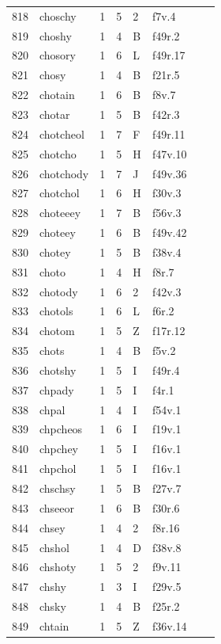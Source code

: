 \documentclass[11pt,a4paper]{article}
\begin{document}
\begin{landscape}
\begin{longtable}{@{}r>{\ttfamily}lrrl>{\ttfamily}l>{\raggedright\arraybackslash}p{80mm}>{\raggedright\arraybackslash}p{36mm}@{}}
818 & choschy & 1 & 5 & 2 & f7v.4 &  & \\
819 & choshy & 1 & 4 & B & f49r.2 &  & \\
820 & chosory & 1 & 6 & L & f49r.17 &  & \\
821 & chosy & 1 & 4 & B & f21r.5 &  & \\
822 & chotain & 1 & 6 & B & f8v.7 &  & \\
823 & chotar & 1 & 5 & B & f42r.3 &  & \\
824 & chotcheol & 1 & 7 & F & f49r.11 &  & \\
825 & chotcho & 1 & 5 & H & f47v.10 &  & \\
826 & chotchody & 1 & 7 & J & f49v.36 &  & \\
827 & chotchol & 1 & 6 & H & f30v.3 &  & \\
828 & choteeey & 1 & 7 & B & f56v.3 &  & \\
829 & choteey & 1 & 6 & B & f49v.42 &  & \\
830 & chotey & 1 & 5 & B & f38v.4 &  & \\
831 & choto & 1 & 4 & H & f8r.7 &  & \\
832 & chotody & 1 & 6 & 2 & f42v.3 &  & \\
833 & chotols & 1 & 6 & L & f6r.2 &  & \\
834 & chotom & 1 & 5 & Z & f17r.12 &  & \\
835 & chots & 1 & 4 & B & f5v.2 &  & \\
836 & chotshy & 1 & 5 & I & f49r.4 &  & \\
837 & chpady & 1 & 5 & I & f4r.1 &  & \\
838 & chpal & 1 & 4 & I & f54v.1 &  & \\
839 & chpcheos & 1 & 6 & I & f19v.1 &  & \\
840 & chpchey & 1 & 5 & I & f16v.1 &  & \\
841 & chpchol & 1 & 5 & I & f16v.1 &  & \\
842 & chschsy & 1 & 5 & B & f27v.7 &  & \\
843 & chseeor & 1 & 6 & B & f30r.6 &  & \\
844 & chsey & 1 & 4 & 2 & f8r.16 &  & \\
845 & chshol & 1 & 4 & D & f38v.8 &  & \\
846 & chshoty & 1 & 5 & 2 & f9v.11 &  & \\
847 & chshy & 1 & 3 & I & f29v.5 &  & \\
848 & chsky & 1 & 4 & B & f25r.2 &  & \\
849 & chtain & 1 & 5 & Z & f36v.14 &  & \\

\end{longtable}
\end{landscape}
\end{document}
